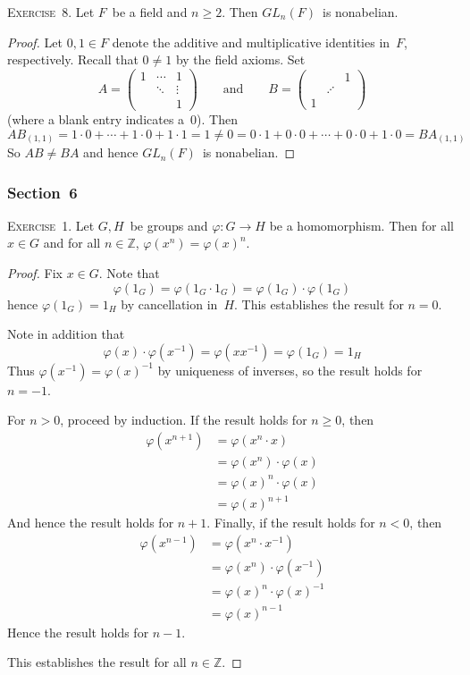 \documentclass[letterpaper]{article}
\newcommand{\exercise}[1]{\goodbreak\noindent\textsc{Exercise~{#1}.}}
\newcommand{\Z}{\mathbb{Z}}
\begin{document}
\exercise{8}
Let $F$~be a field and $n\ge 2$. Then $GL_n(F)$~is nonabelian.
\begin{proof}
Let $0,1\in F$ denote the additive and multiplicative identities in~$F$, respectively. Recall that $0\ne1$ by the field axioms. Set
$$A=\left(\begin{matrix}
1&\cdots&1\\
 &\ddots&\vdots\\
 &      &1
\end{matrix}\right)\qquad\text{and}\qquad
B=\left(\begin{matrix}
 &      &1\\
 &\iddots& \\
1&      & 
\end{matrix}\right)$$
(where a blank entry indicates a~$0$). Then
$$AB_{(1,1)}=1\cdot0+\cdots+1\cdot0+1\cdot1=1\ne0=0\cdot1+0\cdot0+\cdots+0\cdot0+1\cdot0=BA_{(1,1)}$$
So $AB\ne BA$ and hence $GL_n(F)$~is nonabelian.
\end{proof}

\subsubsection*{Section~6}
\exercise{1}
Let $G,H$~be groups and $\varphi:G\to H$ be a homomorphism. Then for all $x\in G$ and for all $n\in\Z$, $\varphi(x^n)=\varphi(x)^n$.
\begin{proof}
Fix $x\in G$. Note that
$$\varphi(1_G)=\varphi(1_G\cdot 1_G)=\varphi(1_G)\cdot\varphi(1_G)$$
hence $\varphi(1_G)=1_H$ by cancellation in~$H$. This establishes the result for $n=0$.

Note in addition that
$$\varphi(x)\cdot\varphi(x^{-1})=\varphi(xx^{-1})=\varphi(1_G)=1_H$$
Thus $\varphi(x^{-1})=\varphi(x)^{-1}$ by uniqueness of inverses, so the result holds for $n=-1$.

For $n>0$, proceed by induction. If the result holds for $n\ge 0$, then
\begin{align*}
\varphi(x^{n+1})&=\varphi(x^n\cdot x)\\
	&=\varphi(x^n)\cdot\varphi(x)\\
	&=\varphi(x)^n\cdot\varphi(x)\\
	&=\varphi(x)^{n+1}
\end{align*}
And hence the result holds for $n+1$. Finally, if the result holds for $n<0$, then
\begin{align*}
\varphi(x^{n-1})&=\varphi(x^n\cdot x^{-1})\\
	&=\varphi(x^n)\cdot\varphi(x^{-1})\\
	&=\varphi(x)^n\cdot\varphi(x)^{-1}\\
	&=\varphi(x)^{n-1}
\end{align*}
Hence the result holds for $n-1$.

This establishes the result for all $n\in\Z$.
\end{proof}
\end{document}
